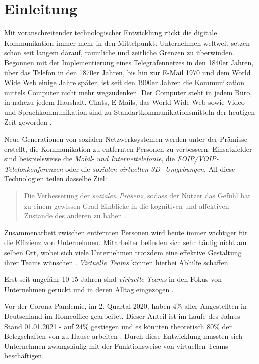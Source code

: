 \documentclass[a4paper,11pt]{article}%
\renewcommand{\\}{\vspace*{0.5\baselineskip} \newline}
\begin{document}
\section*{Einleitung}
	Mit voranschreitender technologischer Entwicklung rückt die digitale Kommunikation immer mehr in den Mittelpunkt. Unternehmen weltweit setzen schon seit langem darauf, räumliche und zeitliche Grenzen zu überwinden. Begonnen mit der Implementierung eines Telegrafennetzes in den 1840er Jahren, über das Telefon in den 1870er Jahren, bis hin zur E-Mail 1970 und dem World Wide Web einige Jahre später, ist seit den 1990er Jahren die Kommunikation mittels Computer nicht mehr wegzudenken. Der Computer steht in jedem Büro, in nahezu jedem Haushalt. Chats, E-Mails, das World Wide Web sowie Video- und Sprachkommunikation sind zu Standartkommunikationsmitteln der heutigen Zeit geworden \citep[p. 14-16]{thurlow2004computer}.
	
Neue Generationen von sozialen Netzwerksystemen werden unter der Prämisse erstellt, die Kommunikation zu entfernten Personen zu verbessern.
Einsatzfelder sind beispielsweise die \textit{Mobil- und Internettelefonie}, die\textit{ FOIP/VOIP-Telefonkonferenzen} oder die \textit{sozialen virtuellen 3D- Umgebungen}.
All diese Technologien teilen dasselbe Ziel: 
\begin{quote}
\glqq{}Die Verbesserung der \textit{sozialen Präsenz}, sodass der Nutzer das Gefühl hat zu einem gewissen Grad Einblicke in die kognitiven und affektiven Zustände des anderen zu haben\dq{} \citep{biocca2002defining} \citep[S. 407–447]{biocca2001plugging}.
\end{quote}

Zusammenarbeit zwischen entfernten Personen wird heute immer wichtiger für die Effizienz von Unternehmen. Mitarbeiter befinden sich sehr häufig nicht am selben Ort, wobei sich viele Unternehmen trotzdem eine effektive Gestaltung ihrer Teams wünschen \citep[S. 791-792]{jarvenpaa1999communication}. \textit{Virtuelle Teams} können hierbei Abhilfe schaffen. 
	
Erst seit ungefähr 10-15 Jahren sind \textit{virtuelle Teams} in den Fokus von Unternehmen gerückt und in deren Alltag eingezogen \citep{gilson2015virtual}.

Vor der Corona-Pandemie, im 2. Quartal 2020, haben 4\% aller Angestellten in Deutschland im Homeoffice gearbeitet. Dieser Anteil ist im Laufe des Jahres - Stand 01.01.2021 - auf 24\% gestiegen und es könnten theoretisch 80\% der Belegschaften von zu Hause arbeiten \citep{statistaCorona2020}. Durch diese Entwicklung mussten sich Unternehmen zwangsläufig mit der Funktionsweise von virtuellen Teams beschäftigen.
\end{document}
